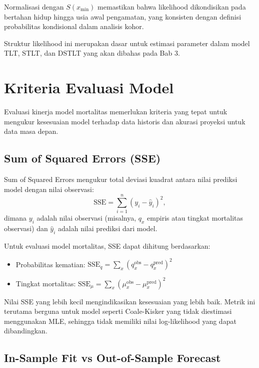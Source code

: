 Normalisasi dengan $S(x_{\min})$ memastikan bahwa likelihood dikondisikan pada bertahan hidup hingga usia awal pengamatan, yang konsisten dengan definisi probabilitas kondisional dalam analisis kohor.

Struktur likelihood ini merupakan dasar untuk estimasi parameter dalam model TLT, STLT, dan DSTLT yang akan dibahas pada Bab 3.



\section{Kriteria Evaluasi Model}

Evaluasi kinerja model mortalitas memerlukan kriteria yang tepat untuk mengukur kesesuaian model terhadap data historis dan akurasi proyeksi untuk data masa depan.

\subsection{Sum of Squared Errors (SSE)}

Sum of Squared Errors mengukur total deviasi kuadrat antara nilai prediksi model dengan nilai observasi:
\begin{equation}
\text{SSE} = \sum_{i=1}^{n} (y_i - \hat{y}_i)^2,
\label{eq:sse}
\end{equation}
dimana $y_i$ adalah nilai observasi (misalnya, $q_x$ empiris atau tingkat mortalitas observasi) dan $\hat{y}_i$ adalah nilai prediksi dari model.

Untuk evaluasi model mortalitas, SSE dapat dihitung berdasarkan:
\begin{itemize}
    \item Probabilitas kematian: $\text{SSE}_q = \sum_x (q_x^{\text{obs}} - q_x^{\text{pred}})^2$
    \item Tingkat mortalitas: $\text{SSE}_\mu = \sum_x (\mu_x^{\text{obs}} - \mu_x^{\text{pred}})^2$
\end{itemize}

Nilai SSE yang lebih kecil mengindikasikan kesesuaian yang lebih baik. Metrik ini terutama berguna untuk model seperti Coale-Kisker yang tidak diestimasi menggunakan MLE, sehingga tidak memiliki nilai log-likelihood yang dapat dibandingkan.

\subsection{In-Sample Fit vs Out-of-Sample Forecast}

